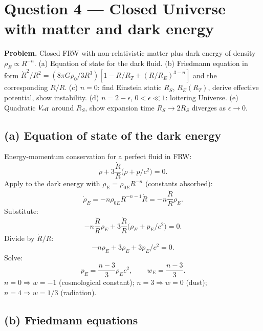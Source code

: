 \documentclass[11pt]{article}
\begin{document}
\section*{Question 4 --- Closed Universe with matter and dark energy}

\textbf{Problem.}  Closed FRW with non-relativistic matter plus dark energy of density $\rho_{E}\propto R^{-n}$.  (a) Equation of state for the dark fluid.  (b) Friedmann equation in form $\dot R^{2}/R^{2}=(8\pi G\rho_{0}/3R^{3})[1-R/R_{T}+(R/R_{E})^{3-n}]$ and the corresponding $\ddot R/R$.  (c) $n=0$: find Einstein static $R_{S}$, $R_{E}(R_{T})$, derive effective potential, show instability.  (d) $n=2-\epsilon$, $0<\epsilon\ll 1$: loitering Universe.  (e) Quadratic $V_{\rm eff}$ around $R_{S}$, show expansion time $R_{S}\to 2R_{S}$ diverges as $\epsilon\to 0$.

\subsection*{(a) Equation of state of the dark energy}

Energy-momentum conservation for a perfect fluid in FRW:
\[
\dot\rho+3\frac{\dot R}{R}\bigl(\rho+p/c^{2}\bigr)=0.
\]
Apply to the dark energy with $\rho_{E}=\rho_{0E}R^{-n}$ (constants absorbed):
\[
\dot\rho_{E}=-n\rho_{0E}R^{-n-1}\dot R=-n\frac{\dot R}{R}\rho_{E}.
\]
Substitute:
\[
-n\frac{\dot R}{R}\rho_{E}+3\frac{\dot R}{R}\bigl(\rho_{E}+p_{E}/c^{2}\bigr)=0.
\]
Divide by $\dot R/R$:
\[
-n\rho_{E}+3\rho_{E}+3p_{E}/c^{2}=0.
\]
Solve:
\begin{equation}
\boxed{\;p_{E}=\frac{n-3}{3}\rho_{E}c^{2},\qquad w_{E}=\frac{n-3}{3}.\;}
\label{eq:eosE}
\end{equation}
$n=0\Rightarrow w=-1$ (cosmological constant); $n=3\Rightarrow w=0$ (dust); $n=4\Rightarrow w=1/3$ (radiation).

\subsection*{(b) Friedmann equations}
\end{document}
